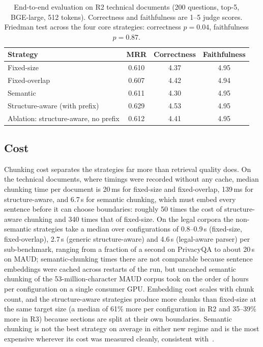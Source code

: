 \documentclass[runningheads]{llncs}
\begin{document}
\begin{table}[t]
\caption{End-to-end evaluation on R2 technical documents (200 questions, top-5, BGE-large, 512 tokens). Correctness and faithfulness are 1--5 judge scores. Friedman test across the four core strategies: correctness $p=0.04$, faithfulness $p=0.87$.}
\label{tab:generation}
\centering
\begin{tabular}{lccc}
\toprule
Strategy & MRR & Correctness & Faithfulness \\
\midrule
Fixed-size & 0.610 & 4.37 & 4.95 \\
Fixed-overlap & 0.607 & 4.42 & 4.94 \\
Semantic & 0.611 & 4.30 & 4.95 \\
Structure-aware (with prefix) & 0.629 & 4.53 & 4.95 \\
\midrule
Ablation: structure-aware, no prefix & 0.612 & 4.41 & 4.95 \\
\bottomrule
\end{tabular}
\end{table}

\subsection{Cost}
\label{sec:cost}
Chunking cost separates the strategies far more than retrieval quality does. On the technical documents, where timings were recorded without any cache, median chunking time per document is 20\,ms for fixed-size and fixed-overlap, 139\,ms for structure-aware, and 6.7\,s for semantic chunking, which must embed every sentence before it can choose boundaries: roughly 50 times the cost of structure-aware chunking and 340 times that of fixed-size. On the legal corpora the non-semantic strategies take a median over configurations of 0.8--0.9\,s (fixed-size, fixed-overlap), 2.7\,s (generic structure-aware) and 4.6\,s (legal-aware parser) per sub-benchmark, ranging from a fraction of a second on PrivacyQA to about 20\,s on MAUD; semantic-chunking times there are not comparable because sentence embeddings were cached across restarts of the run, but uncached semantic chunking of the 53-million-character MAUD corpus took on the order of hours per configuration on a single consumer GPU. Embedding cost scales with chunk count, and the structure-aware strategies produce more chunks than fixed-size at the same target size (a median of 61\% more per configuration in R2 and 35--39\% more in R3) because sections are split at their own boundaries. Semantic chunking is not the best strategy on average in either new regime and is the most expensive wherever its cost was measured cleanly, consistent with~\cite{qu2025semantic}.
\end{document}
